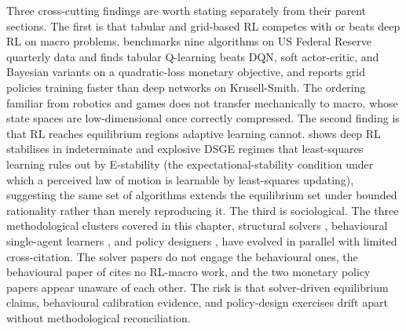 Three cross-cutting findings are worth stating separately from
their parent sections. The first is that tabular and grid-based RL
competes with or beats deep RL on macro problems.
\citet{Wang2025mpu} benchmarks nine algorithms on US Federal
Reserve quarterly data and finds tabular Q-learning beats DQN, soft
actor-critic, and Bayesian variants on a quadratic-loss monetary
objective, and \citet{Yang2025srl} reports grid policies training
faster than deep networks on Krusell-Smith. The ordering familiar
from robotics and games does not transfer mechanically to macro,
whose state spaces are low-dimensional once correctly compressed.
The second finding is that RL reaches equilibrium regions adaptive
learning cannot. \citet{Chen2021drl} shows deep RL stabilises in
indeterminate and explosive DSGE regimes that least-squares
learning rules out by E-stability (the expectational-stability
condition under which a perceived law of motion is learnable by
least-squares updating), suggesting the same set of algorithms
extends the equilibrium set under bounded rationality rather than
merely reproducing it. The third is sociological. The three
methodological clusters covered in this chapter, structural solvers
\citep{Yang2025srl,Wibault2026rspg,Han2022deepham,Azinovic2026sequence},
behavioural single-agent learners
\citep{Kaplowitz2025,Kuriksha2021,Shi2022consumption}, and policy
designers
\citep{Zheng2022aie,Mi2024taxai,Chen2021drl,HinterlangTaenzer2024,Khundadze2025,Wang2025mpu},
have evolved in parallel with limited cross-citation. The solver
papers do not engage the behavioural ones, the behavioural paper of
\citet{Kaplowitz2025} cites no RL-macro work, and the two monetary
policy papers \citep{HinterlangTaenzer2024,Wang2025mpu} appear
unaware of each other. The risk is that solver-driven equilibrium
claims, behavioural calibration evidence, and policy-design
exercises drift apart without methodological reconciliation.
